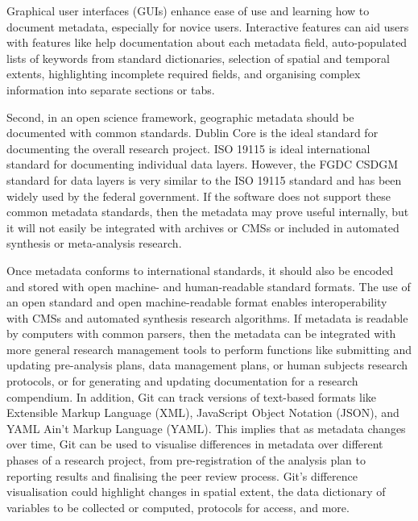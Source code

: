 \documentclass{isprs} %
\begin{document}
Graphical user interfaces (GUIs) enhance ease of use and learning how to document metadata, especially for novice users.
Interactive features can aid users with features like help documentation about each metadata field, auto-populated lists of keywords from standard dictionaries, selection of spatial and temporal extents, highlighting incomplete required fields, and organising complex information into separate sections or tabs.

Second, in an open science framework, geographic metadata should be documented with common standards. Dublin Core is the ideal standard for documenting the overall research project. ISO 19115 is ideal international standard for documenting individual data layers.
However, the FGDC CSDGM standard for data layers is very similar to the ISO 19115 standard and has been widely used by the federal government.
If the software does not support these common metadata standards, then the metadata may prove useful internally, but it will not easily be integrated with archives or CMSs or included in automated synthesis or meta-analysis research.

Once metadata conforms to international standards, it should also be encoded and stored with open machine- and human-readable standard formats. 
The use of an open standard and open machine-readable format enables interoperability with CMSs and automated synthesis research algorithms.
If metadata is readable by computers with common parsers, then the metadata can be integrated with more general research management tools to perform functions like submitting and updating pre-analysis plans, data management plans, or human subjects research protocols, or for generating and updating documentation for a research compendium.
In addition, Git can track versions of text-based formats like Extensible Markup Language (XML), JavaScript Object Notation (JSON), and YAML Ain't Markup Language (YAML).
This implies that as metadata changes over time, Git can be used to visualise differences in metadata over different phases of a research project, from pre-registration of the analysis plan to reporting results and finalising the peer review process.
Git's difference visualisation could highlight changes in spatial extent, the data dictionary of variables to be collected or computed, protocols for access, and more. 
\end{document}
